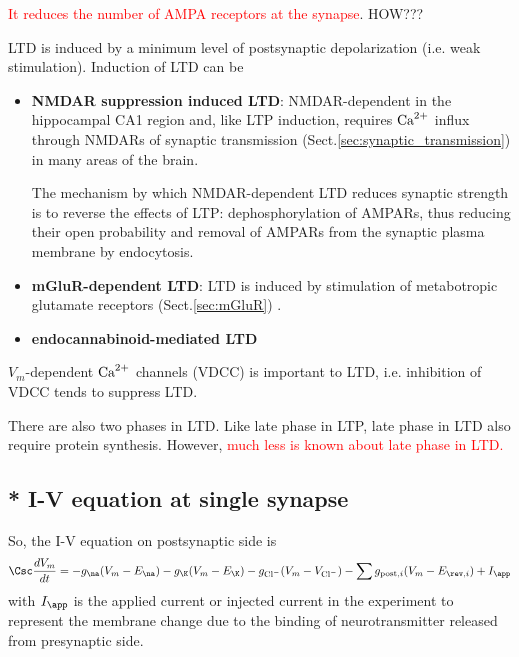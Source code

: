 \textcolor{red}{It reduces the number of AMPA receptors at the synapse}. HOW???

LTD is induced by a minimum level of postsynaptic depolarization (i.e. weak
stimulation). Induction of LTD can be 
\begin{itemize}
  \item {\bf NMDAR suppression induced LTD}: NMDAR-dependent in the hippocampal
CA1 region and, like LTP induction, requires ${\text{Ca}^{2+}}$ influx through NMDARs
\citep{bear1994} of synaptic transmission (Sect.\ref{sec:synaptic_transmission})
in many areas of the brain.

The mechanism by which NMDAR-dependent LTD reduces synaptic strength is to
reverse the effects of LTP: dephosphorylation of AMPARs, thus reducing their
open probability and removal of AMPARs from the synaptic plasma membrane by
endocytosis.

   \item {\bf mGluR-dependent LTD}: LTD is induced by stimulation of
   metabotropic glutamate receptors (Sect.\ref{sec:mGluR})
   \citep{bortolotto1999}.

  \item  {\bf endocannabinoid-mediated LTD} \citep{Sjostrom2003}
  
\end{itemize}

$V_m$-dependent ${\text{Ca}^{2+}}$ channels (VDCC) is important to LTD, i.e. inhibition of
VDCC tends to suppress LTD.

There are also two phases in LTD. Like late phase in LTP, late phase in LTD also
require protein synthesis. However, \textcolor{red}{much less is known about
late phase in LTD.}

\subsection{ * I-V equation at single synapse}
\label{sec:synapse_I-V-curve}

So, the I-V equation on postsynaptic side is
\begin{equation}
\Csc \frac{dV_m}{dt} = -g_\na(V_m-E_\na) - g_\K (V_m - E_\K) - g_\Cl (V_m -
V_\Cl) - \sum g_{\post, i} (V_m - E_{\rev,i}) + I_\app
\end{equation}
with $I_\app$ is the applied current or injected current in the experiment to 
represent the membrane change due to the binding of neurotransmitter
released from presynaptic side.






